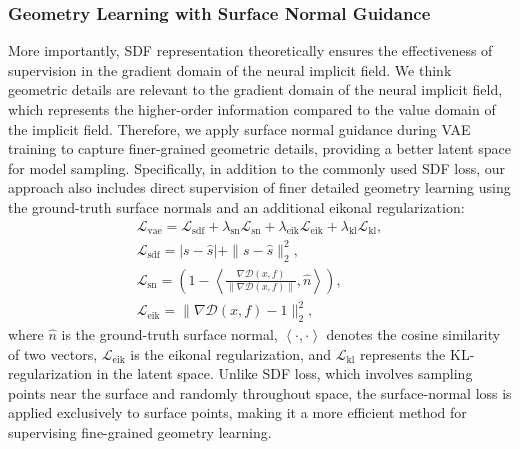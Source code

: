 \subsubsection{Geometry Learning with Surface Normal Guidance}
More importantly, SDF representation theoretically ensures the effectiveness of supervision in the gradient domain of the neural implicit field. 
We think geometric details are relevant to the gradient domain of the neural implicit field, which represents the higher-order information compared to the value domain of the implicit field.
Therefore, we apply surface normal guidance during VAE training to capture finer-grained geometric details, providing a better latent space for model sampling.
Specifically, in addition to the commonly used SDF loss, our approach also includes direct supervision of finer detailed geometry learning using the ground-truth surface normals and an additional eikonal regularization:
\begin{gather}
\mathcal{L}_{\text{vae}}=\mathcal{L}_{\text{sdf}}+\lambda_{\text{sn}}\mathcal{L}_{\text{sn}}+\lambda_{\text{eik}}\mathcal{L}_{\text{eik}}+\lambda_{\text{kl}}\mathcal{L}_{\text{kl}}, \\
\mathcal{L}_{\text{sdf}}=|s - \hat{s}| + \|s - \hat{s}\|_2^2 , \\
\mathcal{L}_{\text{sn}}=\left(1-\left<\frac{\nabla \mathcal{D}\left(x, f\right)}{\|\nabla \mathcal{D}\left(x, f\right)\|}, \hat{n}\right>\right), \\
\mathcal{L}_{\text{eik}}=\|\nabla \mathcal{D}\left(x, f\right)-1\|^2_2,
\end{gather}
where $\hat{n}$ is the ground-truth surface normal, $\left<\cdot,\cdot\right>$ denotes the cosine similarity of two vectors, $\mathcal{L}_\text{eik}$ is the eikonal regularization, and $\mathcal{L}_\text{kl}$ represents the KL-regularization in the latent space.
Unlike SDF loss, which involves sampling points near the surface and randomly throughout space, the surface-normal loss is applied exclusively to surface points, making it a more efficient method for supervising fine-grained geometry learning.


